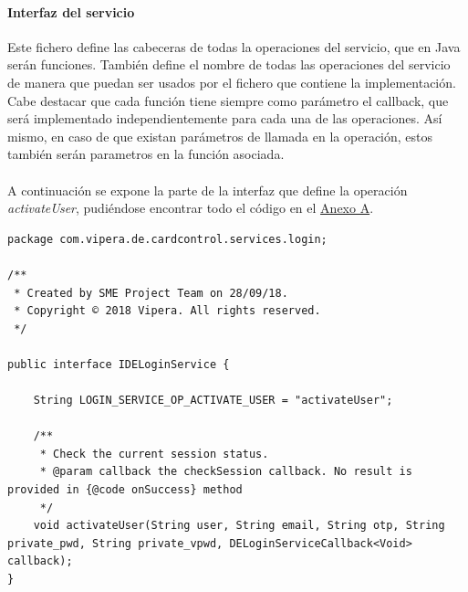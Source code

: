 \documentclass[a4paper, 12pt]{article}
\newenvironment{code}{\captionsetup{type=listing}}{}
\begin{document}
\paragraph{Interfaz del servicio}
\label{sec-4-1-3-1}
Este fichero define las cabeceras de todas la operaciones del servicio, que en Java serán funciones. También define el nombre de todas las operaciones del servicio de manera que puedan ser usados por el
fichero que contiene la implementación. Cabe destacar que cada función tiene siempre como parámetro el callback, que será implementado independientemente para cada una de las operaciones. Así mismo, en caso
de que existan parámetros de llamada en la operación, estos también serán parametros en la función asociada.
\\
\\
A continuación se expone la parte de la interfaz que define la operación \emph{activateUser}, pudiéndose encontrar todo el código en el \hyperref[code:android-interface-complete]{Anexo A}.
\begin{code}
\label{code:android-interface}
\begin{verbatim}
package com.vipera.de.cardcontrol.services.login;

/**
 * Created by SME Project Team on 28/09/18.
 * Copyright © 2018 Vipera. All rights reserved.
 */

public interface IDELoginService {

    String LOGIN_SERVICE_OP_ACTIVATE_USER = "activateUser";

    /**
     * Check the current session status.
     * @param callback the checkSession callback. No result is provided in {@code onSuccess} method
     */
    void activateUser(String user, String email, String otp, String private_pwd, String private_vpwd, DELoginServiceCallback<Void> callback);
}

\end{verbatim}
\end{code}
\bigbreak
\end{document}
